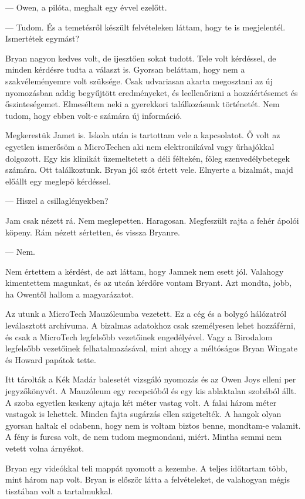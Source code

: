 \documentclass[10pt]{memoir}
\begin{document}
--- Owen, a pilóta, meghalt egy évvel ezelőtt.

--- Tudom. És a temetésről készült felvételeken láttam, hogy te is megjelentél.
Ismertétek egymást?

Bryan nagyon kedves volt, de ijesztően sokat tudott. Tele volt kérdéssel, de
minden kérdésre tudta a választ is. Gyorsan beláttam, hogy nem a
szakvéleményemre volt szüksége. Csak udvariasan akarta megosztani az új
nyomozásban addig begyűjtött eredményeket, és leellenőrizni a hozzáértésemet és
őszinteségemet. Elmeséltem neki a gyerekkori találkozásunk történetét. Nem
tudom, hogy ebben volt-e számára új információ.

Megkerestük Jamet is. Iskola után is tartottam vele a kapcsolatot. Ő volt az
egyetlen ismerősöm a MicroTechen aki nem elektronikával vagy űrhajókkal
dolgozott. Egy kis klinikát üzemeltetett a déli féltekén, főleg
szenvedélybetegek számára. Ott találkoztunk. Bryan jól szót értett vele.
Elnyerte a bizalmát, majd előállt egy meglepő kérdéssel.

--- Hiszel a csillaglényekben?

Jam csak nézett rá. Nem meglepetten. Haragosan. Megfeszült rajta a fehér ápolói
köpeny. Rám nézett sértetten, és vissza Bryanre.

--- Nem.

Nem értettem a kérdést, de azt láttam, hogy Jamnek nem esett jól. Valahogy
kimentettem magunkat, és az utcán kérdőre vontam Bryant. Azt mondta, jobb, ha
Owentől hallom a magyarázatot.

Az utunk a MicroTech Mauzóleumba vezetett. Ez a cég és a bolygó hálózatról
leválasztott archívuma. A bizalmas adatokhoz csak személyesen lehet hozzáférni,
és csak a MicroTech legfelsőbb vezetőinek engedélyével. Vagy a Birodalom
legfelsőbb vezetőinek felhatalmazásával, mint ahogy a méltóságos Bryan Wingate
és Howard papátok tette.

Itt tárolták a Kék Madár balesetét vizsgáló nyomozás és az Owen Joys elleni per
jegyzőkönyvét. A Mauzóleum egy recepcióból és egy kis ablaktalan szobából állt.
A szoba egyetlen keskeny ajtaja két méter vastag volt. A falai három méter
vastagok is lehettek. Minden fajta sugárzás ellen szigetelték. A hangok olyan
gyorsan haltak el odabenn, hogy nem is voltam biztos benne, mondtam-e valamit.
A fény is furcsa volt, de nem tudom megmondani, miért. Mintha semmi nem vetett
volna árnyékot.

Bryan egy videókkal teli mappát nyomott a kezembe. A teljes időtartam több,
mint három nap volt. Bryan is először látta a felvételeket, de valahogyan mégis
tisztában volt a tartalmukkal.
\end{document}
